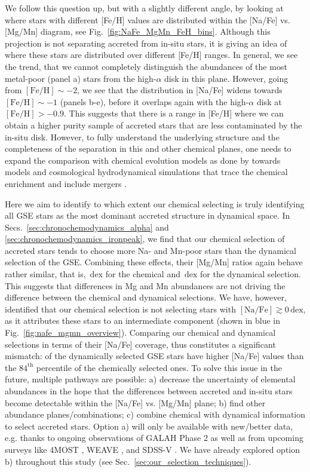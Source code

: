 \documentclass[fleqn,usenatbib]{mnras}
\newcommand{\dex}{\,\mathrm{dex}}	%
\begin{document}
We follow this question up, but with a slightly different angle, by looking at where stars with different [Fe/H] values are distributed within the [Na/Fe] vs. [Mg/Mn] diagram, see Fig.~\ref{fig:NaFe_MgMn_FeH_bins}. Although this projection is not separating accreted from in-situ stars, it is giving an idea of where these stars are distributed over different [Fe/H] ranges. In general, we see the trend, that we cannot completely distinguish the abundances of the most metal-poor (panel a) stars from the high-$\alpha$ disk in this plane. However, going from $\mathrm{[Fe/H]} \sim -2$, we see that the distribution in [Na/Fe] widens towards $\mathrm{[Fe/H]} \sim -1$ (panels b-e), before it overlaps again with the high-$\alpha$ disk at $\mathrm{[Fe/H]} > - 0.9$. This suggests that there is a range in [Fe/H] where we can obtain a higher purity sample of accreted stars that are less contaminated by the in-situ disk. However, to fully understand the underlying structure and the completeness of the separation in this and other chemical planes, one needs to expand the comparison with chemical evolution models as done by \citet{Horta2021} towards models and cosmological hydrodynamical simulations that trace the chemical enrichment and include mergers \citep[see e.g.][]{Buck2020, Buck2021, Sestito2021}.

Here we aim to identify to which extent our chemical selecting is truly identifying all GSE stars as the most dominant accreted structure in dynamical space. In Secs.~\ref{sec:chronochemodynamics_alpha} and \ref{sec:chronochemodynamics_ironpeak}, we find that our chemical selection of accreted stars tends to choose more Na- and Mn-poor stars than the dynamical selection of the GSE. Combining these effects, their [Mg/Mn] ratios again behave rather similar, that is, $\dex$ for the chemical and $\dex$ for the dynamical selection. This suggests that differences in Mg and Mn abundances are not driving the difference between the chemical and dynamical selections. We have, however, identified that our chemical selection is not selecting stars with $\mathrm{[Na/Fe]} \gtrsim 0\dex$, as it attributes these stars to an intermediate component (shown in blue in Fig.~\ref{fig:nafe_mgmn_overview}). Comparing our chemical and dynamical selections in terms of their [Na/Fe] coverage, thus constitutes a significant mismatch:  of the dynamically selected GSE stars have higher [Na/Fe] values than the $84^\text{th}$ percentile of the chemically selected ones. To solve this issue in the future, multiple pathways are possible: a) decrease the uncertainty of elemental abundances in the hope that the differences between accreted and in-situ stars become detectable within the [Na/Fe] vs. [Mg/Mn] plane; b) find other abundance planes/combinations; c) combine chemical with dynamical information to select accreted stars. Option a) will only be available with new/better data, e.g. thanks to ongoing observations of GALAH Phase 2 as well as from upcoming surveys like 4MOST \citep{deJong2019}, WEAVE \citep{WEAVE2018}, and SDSS-V \citep{Kollmeier2017}. We have already explored option b) throughout this study (see Sec.~\ref{sec:our_selection_techniques}).
\end{document}
